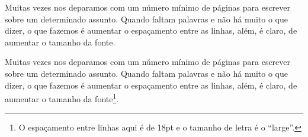 
\newpage

\thispagestyle{empty}

\noindent
Muitas vezes nos deparamos com um n\'umero m\'inimo de p\'aginas para escrever sobre um determinado assunto. Quando faltam palavras e n\~ao h\'a muito o que dizer, o que fazemos \'e aumentar o espa\c{c}amento entre as linhas, al\'em, \'e claro, de aumentar o tamanho da fonte.
\\

\baselineskip=18pt

{\large 
\noindent
Muitas vezes nos deparamos com um n\'umero m\'inimo de p\'aginas para escrever sobre um determinado assunto. Quando faltam palavras e n\~ao h\'a muito o que dizer, o que fazemos \'e aumentar o espa\c{c}amento entre as linhas, al\'em, \'e claro, de aumentar o tamanho da fonte\footnote{O espa\c{c}amento entre linhas aqui \'e de 18pt e o tamanho de letra \'e o ``large''.}.}